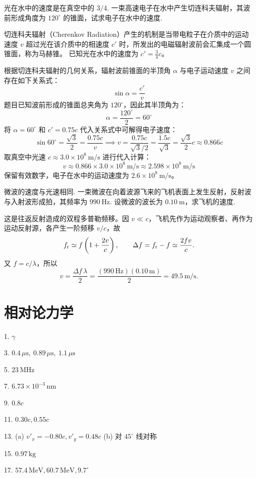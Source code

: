 \begin{exercise}\label{ex:8.21}
光在水中的速度是在真空中的 $3/4$. 一束高速电子在水中产生切连科夫辐射，其波前形成角度为 $120^\circ$ 的锥面，试求电子在水中的速度.
\end{exercise}
\begin{solution}
切连科夫辐射（Cherenkov Radiation）产生的机制是当带电粒子在介质中的运动速度 $v$ 超过光在该介质中的相速度 $c'$ 时，所发出的电磁辐射波前会汇集成一个圆锥面，称为马赫锥。
已知光在水中的速度为 $c' = \frac{3}{4} c$。

根据切连科夫辐射的几何关系，辐射波前锥面的半顶角 $\alpha$ 与电子运动速度 $v$ 之间存在如下关系式：
$$ \sin\alpha = \frac{c'}{v} $$
题目已知波前形成的锥面总夹角为 $120^\circ$，因此其半顶角为：
$$ \alpha = \frac{120^\circ}{2} = 60^\circ $$
将 $\alpha = 60^\circ$ 和 $c' = 0.75 c$ 代入关系式中可解得电子速度：
$$ \sin 60^\circ = \frac{\sqrt{3}}{2} = \frac{0.75 c}{v} \implies v = \frac{0.75 c}{\sqrt{3}/2} = \frac{1.5 c}{\sqrt{3}} = \frac{\sqrt{3}}{2} c \approx 0.866 c $$
取真空中光速 $c \approx 3.0 \times 10^8 \ \mathrm{m/s}$ 进行代入计算：
$$ v \approx 0.866 \times 3.0 \times 10^8 \ \mathrm{m/s} \approx 2.598 \times 10^8 \ \mathrm{m/s} $$
保留有效数字，电子在水中的运动速度为 $2.6 \times 10^8 \ \mathrm{m/s}$。
\end{solution}

\begin{exercise}\label{ex:8.22}
微波的速度与光速相同. 一束微波在向着波源飞来的飞机表面上发生反射，反射波与入射波形成拍，其频率为 $990 \ \mathrm{Hz}$. 设微波的波长为 $0.10 \ \mathrm{m}$，求飞机的速度.
\end{exercise}
\begin{solution}
这是往返反射造成的双程多普勒频移。因 $v\ll c$，飞机先作为运动观察者、再作为运动反射源，各产生一阶频移 $v/c$，故
\[
f_{\rm r}\simeq f\left(1+\frac{2v}{c}\right),\qquad
\Delta f=f_{\rm r}-f\simeq\frac{2fv}{c}.
\]
又 $f=c/\lambda$，所以
\[
\boxed{v=\frac{\Delta f\,\lambda}{2}}
=\frac{(990\,\mathrm{Hz})(0.10\,\mathrm m)}{2}
=49.5\,\mathrm{m/s}.
\]
\end{solution}



\chapter{相对论力学}

\begin{oddanswers}
1. $\gamma$

3. $0.4\,\mu\mathrm{s},\ 0.89\,\mu\mathrm{s},\ 1.1\,\mu\mathrm{s}$

5. $23\,\mathrm{MHz}$

7. $6.73 \times 10^{-3}\,\mathrm{nm}$

9. $0.8c$

11. $0.30c, 0.55c$

13. (a) $v'_x = -0.80c, v'_y = 0.48c$
(b) 对 $45^\circ$ 线对称

15. $0.97\,\mathrm{kg}$

17. $57.4\,\mathrm{MeV}, 60.7\,\mathrm{MeV}, 9.7^\circ$
\end{oddanswers}

